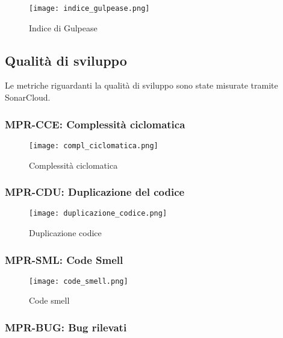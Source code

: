 \documentclass[../piano-di-qualifica.tex]{subfiles}
\begin{document}

\begin{figure}[H]
  \centering
  \texttt{[image: indice\_gulpease.png]}%
  \caption{Indice di Gulpease}%
  \label{fig:gulpease}%
\end{figure}

\newpage

\subsection{Qualità di sviluppo}%
\label{sub:qualita_sviluppo_report}
Le metriche riguardanti la qualità di sviluppo sono state misurate tramite SonarCloud.

\subsubsection{MPR-CCE\@: Complessità ciclomatica}%
\label{subs:complessita_ciclomatica}

\begin{figure}[H]
  \centering
  \texttt{[image: compl\_ciclomatica.png]}%
  \caption{Complessità ciclomatica}%
  \label{fig:compl_ciclomatica}%
\end{figure}

\subsubsection{MPR-CDU\@: Duplicazione del codice}%
\label{subs:duplicazione_codice}

\begin{figure}[H]
  \centering
  \texttt{[image: duplicazione\_codice.png]}%
  \caption{Duplicazione codice}%
  \label{fig:duplicazione_codice}%
\end{figure}


\subsubsection{MPR-SML\@: Code Smell}%
\label{subs:code_smell}


\begin{figure}[H]
  \centering
  \texttt{[image: code\_smell.png]}%
  \caption{Code smell}%
  \label{fig:code_smell}%
\end{figure}


\subsubsection{MPR-BUG\@: Bug rilevati}%
\label{subs:bug_rilevati}
\end{document}
